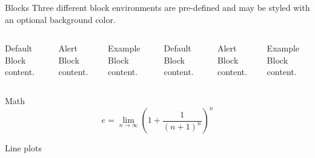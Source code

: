 \documentclass[10pt]{beamer}
\begin{document}
\begin{frame}{Blocks}
  Three different block environments are pre-defined and may be styled with an
  optional background color.

  \begin{columns}[T,onlytextwidth]
      \begin{block}{Default}
        Block content.
      \end{block}

      \begin{alertblock}{Alert}
        Block content.
      \end{alertblock}

      \begin{exampleblock}{Example}
        Block content.
      \end{exampleblock}



      \begin{block}{Default}
        Block content.
      \end{block}

      \begin{alertblock}{Alert}
        Block content.
      \end{alertblock}

      \begin{exampleblock}{Example}
        Block content.
      \end{exampleblock}

  \end{columns}
\end{frame}
\begin{frame}{Math}
  \begin{equation*}
    e = \lim_{n\to \infty} \left(1 + \frac{1}{(n+1)^n}\right)^n
  \end{equation*}
\end{frame}
\begin{frame}{Line plots}
  \begin{figure}
  \end{figure}
\end{frame}
\end{document}
